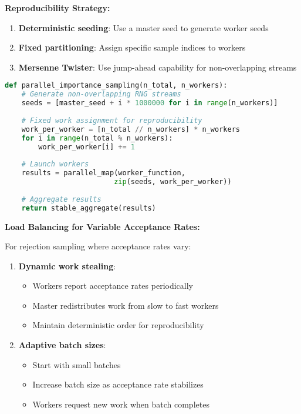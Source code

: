 \documentclass[11pt]{article}
\begin{document}
\textbf{Reproducibility Strategy:}
\begin{enumerate}
\item \textbf{Deterministic seeding}: Use a master seed to generate worker seeds
\item \textbf{Fixed partitioning}: Assign specific sample indices to workers
\item \textbf{Mersenne Twister}: Use jump-ahead capability for non-overlapping streams
\end{enumerate}

\begin{lstlisting}[language=Python, basicstyle=\small]
def parallel_importance_sampling(n_total, n_workers):
    # Generate non-overlapping RNG streams
    seeds = [master_seed + i * 1000000 for i in range(n_workers)]
    
    # Fixed work assignment for reproducibility
    work_per_worker = [n_total // n_workers] * n_workers
    for i in range(n_total % n_workers):
        work_per_worker[i] += 1
    
    # Launch workers
    results = parallel_map(worker_function, 
                          zip(seeds, work_per_worker))
    
    # Aggregate results
    return stable_aggregate(results)
\end{lstlisting}

\textbf{Load Balancing for Variable Acceptance Rates:}

For rejection sampling where acceptance rates vary:

\begin{enumerate}
\item \textbf{Dynamic work stealing}:
   \begin{itemize}
   \item Workers report acceptance rates periodically
   \item Master redistributes work from slow to fast workers
   \item Maintain deterministic order for reproducibility
   \end{itemize}
\item \textbf{Adaptive batch sizes}:
   \begin{itemize}
   \item Start with small batches
   \item Increase batch size as acceptance rate stabilizes
   \item Workers request new work when batch completes
   \end{itemize}
\end{enumerate}
\end{document}
